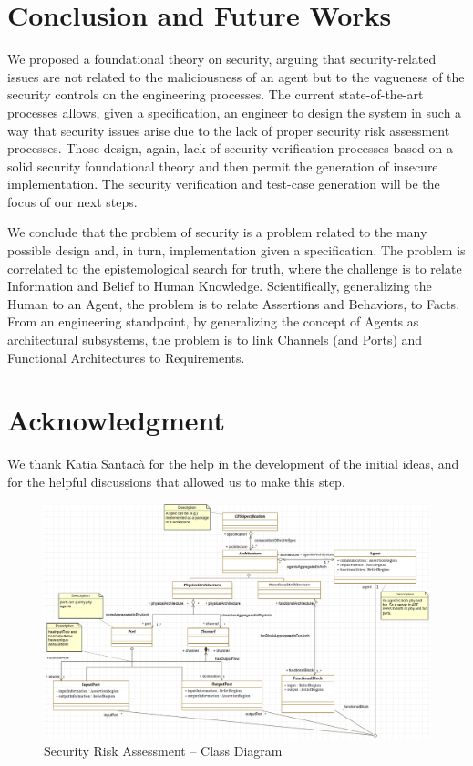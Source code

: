 \documentclass[conference]{IEEEtran}
\begin{document}
\section{Conclusion and Future Works}
We proposed a foundational theory on security, arguing that
security-related issues are not related to the maliciousness of an agent but to
the vagueness of the security controls on the engineering processes.
The current state-of-the-art processes allows, given a specification,
an engineer to design the system in such a way that security issues arise due to the lack
of proper security risk assessment processes.
Those design, again, lack of security verification processes based on a solid 
security foundational theory and then permit the generation of insecure implementation.
The security verification and test-case generation will be the focus of our next steps.

We conclude that the problem of security is a problem related to the 
many possible design and, in turn, implementation given a specification.
The problem is correlated to the epistemological search for truth,
where the challenge is to relate Information and Belief to Human Knowledge.
Scientifically, generalizing the Human to an Agent, the problem is
to relate Assertions and Behaviors, to Facts. From an engineering standpoint,
by generalizing the concept of Agents as architectural subsystems, the
problem is to link Channels (and Ports) and Functional Architectures to 
Requirements.

\section*{Acknowledgment}
We thank Katia Santac\`a for the help in the development of the initial ideas, and for
the helpful discussions that allowed us to make this step.


%
%
\printbibliography

\appendix
\begin{figure}
	\centering
	\includegraphics[width=\textwidth]{secra_classDiagram.png}
	\caption{Security Risk Assessment -- Class Diagram}
	\label{fig:secraclassdiagram}
\end{figure}
\end{document}
